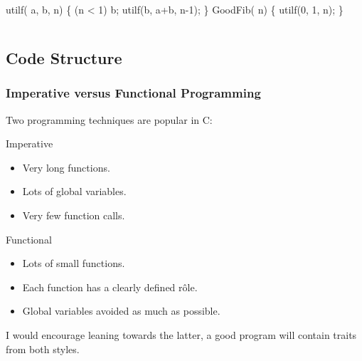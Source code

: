 \documentclass[smaller,table]{beamer}
\begin{document}
\begin{frame}[fragile]
\begin{columns}
\begin{column}{7cm}
\begin{exampleblock}{}
\begin{semiverbatim}
 utilf( a,  b,  n)
\{
   (n < 1)  b;
    utilf(b, a+b, n-1);
\}
 GoodFib( n)
\{
    utilf(0, 1, n);
\}
\end{semiverbatim}
\end{exampleblock}
\end{column}
\begin{column}{3cm}
\end{column}
\end{columns}
\end{frame}

\subsection{Code Structure}
\begin{frame}
\frametitle{Imperative versus Functional Programming}
Two programming techniques are popular in C:
\begin{alertblock}{Imperative}
\begin{itemize}
\item Very long functions.
\item Lots of global variables.
\item Very few function calls.
\end{itemize}
\end{alertblock}

\begin{exampleblock}{Functional}
\begin{itemize}
\item Lots of small functions.
\item Each function has a clearly defined r\^ole.
\item Global variables avoided as much as possible.
\end{itemize}
\end{exampleblock}
I would encourage leaning towards the latter, a good program will contain traits from both styles.
\end{frame}
\end{document}
